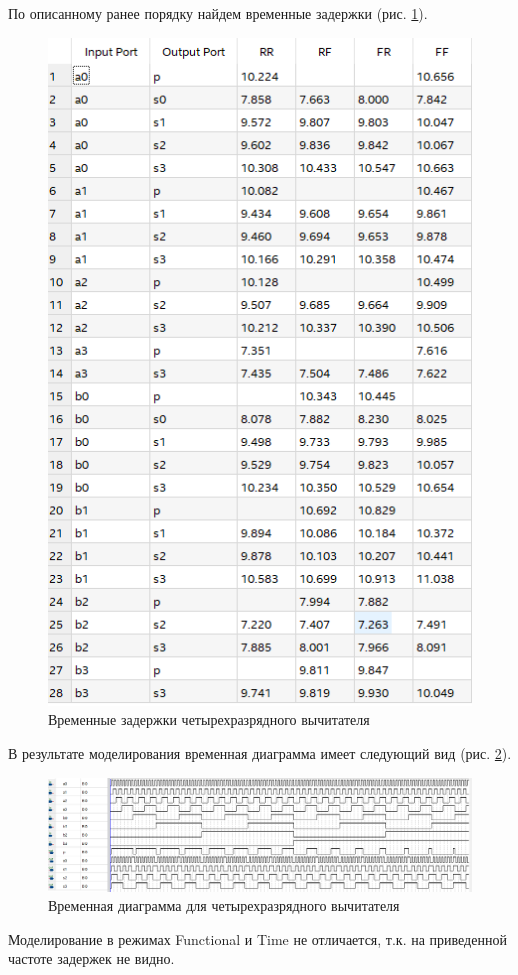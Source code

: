 \documentclass[a4paper,14pt]{article}
\begin{document}
По описанному ранее порядку найдем временные задержки (рис. \ref{fig:044victime}).

\begin{figure}[H]
	\centering
	\includegraphics[width=0.7\linewidth]{image/lab4/04_4vic_time}
	\caption{Временные задержки четырехразрядного вычитателя}
	\label{fig:044victime}
\end{figure}

В результате моделирования временная диаграмма имеет следующий вид (рис. \ref{fig:044vicwvf}).

\begin{figure}[H]
	\centering
	\includegraphics[width=0.9\linewidth]{image/lab4/04_4vic_wvf}
	\caption{Временная диаграмма для четырехразрядного вычитателя}
	\label{fig:044vicwvf}
\end{figure}


Моделирование в режимах Functional и Time не отличается, т.к. на приведенной частоте задержек не видно.
\end{document}

